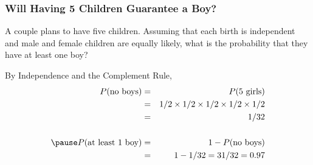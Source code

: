 \documentclass{beamer}
\begin{document}
\begin{frame}
\frametitle{Will Having 5 Children Guarantee a Boy? }
A couple plans to have five children. Assuming that each birth is independent and male and female children are equally likely, what is the probability that they have at least one boy?
\vspace{1em}

\pause
\alert{By Independence and the Complement Rule,}
	\begin{eqnarray*}
		P(\mbox{no boys})&=& P(\mbox{5 girls})\\
							&=& 1/2 \times 1/2 \times 1/2 \times 1/2 \times 1/2\\
							&=&\ 1/32\\ \\ \pause
		P(\mbox{at least 1 boy})&=&1 - P(\mbox{no boys})\\
		&=&1 - 1/32 =31/32 = 0.97
	\end{eqnarray*}

\end{frame}
%
%
\end{document}
